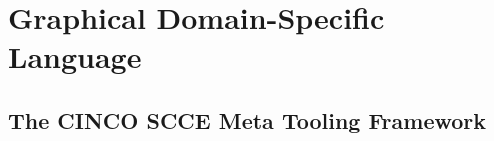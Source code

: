\chapter{Graphical Domain-Specific Language}
\label{ch:chap2}
\section{The CINCO SCCE Meta Tooling Framework}